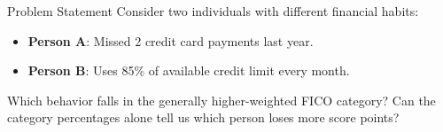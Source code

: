 \begin{block}{Problem Statement}
  Consider two individuals with different financial habits:
  \begin{itemize}
    \item \textbf{Person A}: Missed 2 credit card payments last year.
    \item \textbf{Person B}: Uses 85\% of available credit limit every month.
  \end{itemize}
  Which behavior falls in the generally higher-weighted FICO category? Can the category percentages alone tell us which person loses more score points?
\end{block}

\vspace{0.5em}
\centering
{}

